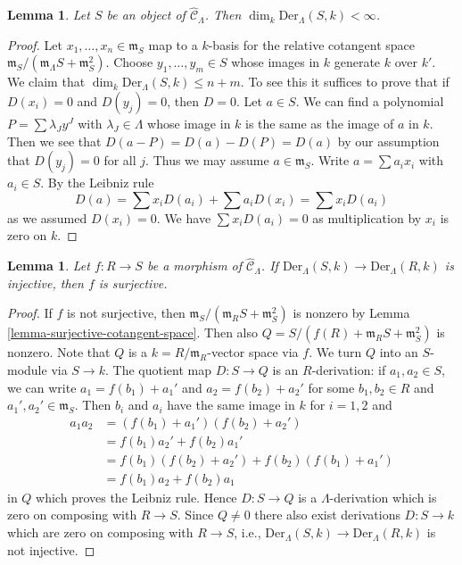 \documentclass{stacks-project}
\theoremstyle{plain}
\newtheorem{lemma}[subsection]{Lemma}
\theoremstyle{definition}
\theoremstyle{remark}
\numberwithin{equation}{subsection}
\begin{document}
\begin{lemma}
\label{lemma-derivations-finite}
Let $S$ be an object of $\widehat{\mathcal{C}}_\Lambda$.
Then $\dim_k \text{Der}_\Lambda(S, k) < \infty$.
\end{lemma}

\begin{proof}
Let $x_1, \ldots, x_n \in \mathfrak m_S$ map to a $k$-basis
for the relative cotangent space
$\mathfrak m_S/(\mathfrak m_\Lambda S + \mathfrak m_S^2)$.
Choose $y_1, \ldots, y_m \in S$ whose images in $k$ generate $k$
over $k'$. We claim that $\dim_k \text{Der}_\Lambda(S, k) \leq n + m$.
To see this it suffices to prove that if $D(x_i) = 0$ and
$D(y_j) = 0$, then $D = 0$. Let $a \in S$. We can find a
polynomial $P = \sum \lambda_J y^J$ with $\lambda_J \in \Lambda$
whose image in $k$ is the same as the image of $a$ in $k$.
Then we see that $D(a - P) = D(a) - D(P) = D(a)$ by our assumption
that $D(y_j) = 0$ for all $j$. Thus we may assume $a \in \mathfrak m_S$.
Write $a = \sum a_i x_i$ with $a_i \in S$. By the Leibniz rule
$$
D(a) = \sum x_iD(a_i) + \sum a_iD(x_i) = \sum x_iD(a_i)
$$
as we assumed $D(x_i) = 0$. We have $\sum x_iD(a_i) = 0$
as multiplication by $x_i$ is zero on $k$.
\end{proof}

\begin{lemma}
\label{lemma-derivations-surjective}
Let $f : R \to S$ be a morphism of $\widehat{\mathcal{C}}_\Lambda$.
If $\text{Der}_\Lambda(S, k) \to \text{Der}_\Lambda(R, k)$ is injective,
then $f$ is surjective.
\end{lemma}

\begin{proof}
If $f$ is not surjective, then
$\mathfrak m_S/(\mathfrak m_R S + \mathfrak m_S^2)$ is nonzero by
Lemma \ref{lemma-surjective-cotangent-space}.
Then also $Q = S/(f(R) + \mathfrak m_R S + \mathfrak m_S^2)$ is nonzero.
Note that $Q$ is a $k = R/\mathfrak m_R$-vector space via $f$. We turn
$Q$ into an $S$-module via $S \to k$. The quotient
map $D : S \to Q$ is an $R$-derivation: if $a_1, a_2 \in S$, we can write
$a_1 = f(b_1) + a_1'$ and $a_2 = f(b_2) + a_2'$ for some
$b_1, b_2 \in R$ and $a_1', a_2' \in \mathfrak m_S$. Then
$b_i$ and $a_i$ have the same image in $k$ for $i = 1, 2$ and
\begin{align*}
a_1a_2 & = (f(b_1) + a_1')(f(b_2) + a_2') \\
& = f(b_1)a_2' + f(b_2)a_1' \\
& = f(b_1)(f(b_2) + a_2') + f(b_2)(f(b_1) + a_1') \\
& = f(b_1)a_2 + f(b_2)a_1
\end{align*}
in $Q$ which proves the Leibniz rule. Hence $D : S \to Q$ is a
$\Lambda$-derivation which is zero on composing with $R \to S$.
Since $Q \not = 0$ there also exist derivations $D : S \to k$ which
are zero on composing with $R \to S$, i.e.,
$\text{Der}_\Lambda(S, k) \to \text{Der}_\Lambda(R, k)$ is not injective.
\end{proof}
\end{document}
